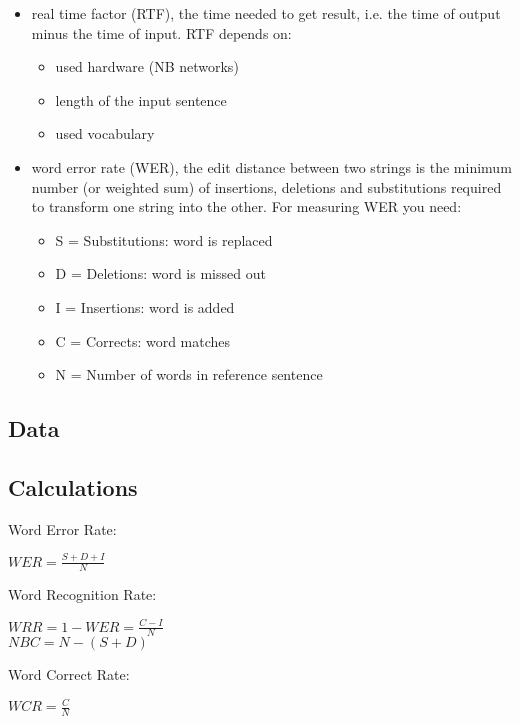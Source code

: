 \documentclass{article}
\begin{document}
\begin{itemize}
    \item real time factor (RTF), the time needed to get result, i.e. the time of output minus the time of input. RTF depends on:
    \begin{itemize}
        \item used hardware (NB networks)
        \item length of the input sentence
        \item used vocabulary
    \end{itemize}
    \item word error rate (WER), the edit distance between two strings is the minimum number (or weighted sum) of insertions, deletions and substitutions required to transform one string into the other. For measuring WER you need:
    \begin{itemize}
        \item S = Substitutions: word is replaced
        \item D = Deletions: word is missed out
        \item I = Insertions: word is added
        \item C = Corrects: word matches
        \item N = Number of words in reference sentence
    \end{itemize}
\end{itemize}


\subsection{Data}

\subsection{Calculations}
    
    Word Error Rate: 
    \begin{center}
    $ WER = \frac{S + D + I}{N}$ \\
    \end{center} 
    
    Word Recognition Rate: 
    \begin{center}
    $ WRR = 1 - WER = \frac{C - I}{N}$ \\
    $ NBC =N - (S + D)$ \\
    \end{center} 
    
    Word Correct Rate: 
    \begin{center}
    $ WCR = \frac{C}{N}$ \\
    \end{center} 
    
\end{document}
